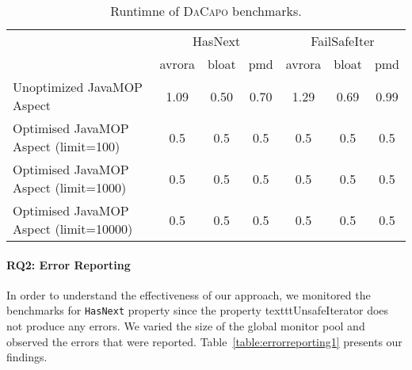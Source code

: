 \begin{table*}[!ht]
\centering
\scriptsize
\begin{tabular}{|p{4cm}|c|c|c|c|c|c|}
\hline
  \multirow{2}{*}{}                                 & 
\multicolumn{3}{c|}{HasNext}           & \multicolumn{3}{c|}{FailSafeIter}       
      \\ \cline{2-7}                                              
                    & avrora           & bloat         & pmd      & avrora       
    & bloat         & pmd \\ \hline
Unoptimized JavaMOP Aspect     & 1.09 & 0.50 & 0.70  & 1.29 & 0.69 & 0.99 \\ 
\hline
Optimised JavaMOP Aspect (limit=100)   & 0.5  & 0.5  & 0.5   & 0.5  & 0.5  & 0.5 
  \\ \hline
Optimised JavaMOP Aspect (limit=1000)   & 0.5  & 0.5  & 0.5   & 0.5  & 0.5  & 
0.5   \\ \hline
Optimised JavaMOP Aspect (limit=10000)   & 0.5  & 0.5  & 0.5   & 0.5  & 0.5  & 
0.5   \\ \hline

\end{tabular}
\caption{Runtimne of \textsc{DaCapo} benchmarks.}
\end{table*}
\label{table:memoryusage}


\paragraph{RQ2: Error Reporting}

In order to understand the effectiveness of our approach, we monitored the 
benchmarks for \texttt{HasNext} property since the property 
texttt{UnsafeIterator} does not produce
any errors. We varied the size of the global monitor pool and observed the 
errors that were reported. Table~\ref{table:errorreporting1} presents our 
findings.




